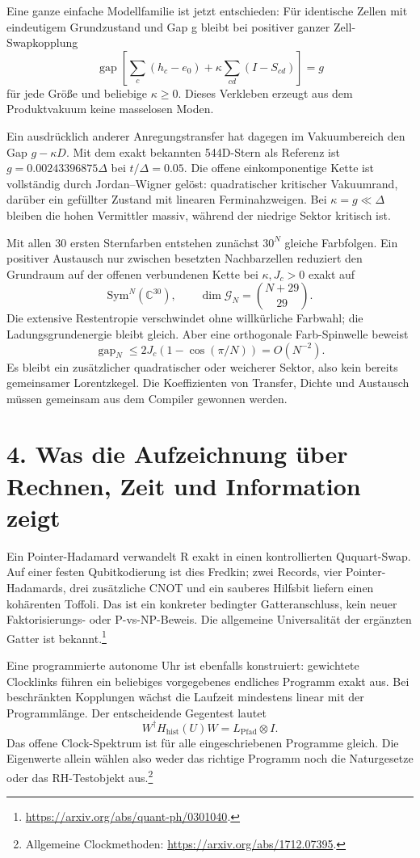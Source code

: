 Eine ganze einfache Modellfamilie ist jetzt entschieden: Für identische Zellen mit eindeutigem Grundzustand und Gap g bleibt bei positiver ganzer Zell-Swapkopplung
\[
\operatorname{gap}\left[\sum_c(h_c-e_0)+\kappa\sum_{cd}(I-S_{cd})\right]=g
\]
für jede Größe und beliebige $\kappa\ge0$. Dieses Verkleben erzeugt aus dem Produktvakuum keine masselosen Moden.

Ein ausdrücklich anderer Anregungstransfer hat dagegen im Vakuumbereich den Gap $g-\kappa D$. Mit dem exakt bekannten 544D-Stern als Referenz ist $g=0.00243396875\Delta$ bei $t/\Delta=0.05$. Die offene einkomponentige Kette ist vollständig durch Jordan--Wigner gelöst: quadratischer kritischer Vakuumrand, darüber ein gefüllter Zustand mit linearen Ferminahzweigen. Bei $\kappa=g\ll\Delta$ bleiben die hohen Vermittler massiv, während der niedrige Sektor kritisch ist.

Mit allen 30 ersten Sternfarben entstehen zunächst $30^N$ gleiche Farbfolgen. Ein positiver Austausch nur zwischen besetzten Nachbarzellen reduziert den Grundraum auf der offenen verbundenen Kette bei $\kappa,J_c>0$ exakt auf
\[
\mathrm{Sym}^N(\mathbb C^{30}),\qquad\dim\mathcal G_N={N+29\choose29}.
\]
Die extensive Restentropie verschwindet ohne willkürliche Farbwahl; die Ladungsgrundenergie bleibt gleich. Aber eine orthogonale Farb-Spinwelle beweist
\[
\operatorname{gap}_N\le2J_c(1-\cos(\pi/N))=O(N^{-2}).
\]
Es bleibt ein zusätzlicher quadratischer oder weicherer Sektor, also kein bereits gemeinsamer Lorentzkegel. Die Koeffizienten von Transfer, Dichte und Austausch müssen gemeinsam aus dem Compiler gewonnen werden.

\section*{4. Was die Aufzeichnung über Rechnen, Zeit und Information zeigt}
Ein Pointer-Hadamard verwandelt R exakt in einen kontrollierten Ququart-Swap. Auf einer festen Qubitkodierung ist dies Fredkin; zwei Records, vier Pointer-Hadamards, drei zusätzliche CNOT und ein sauberes Hilfsbit liefern einen kohärenten Toffoli. Das ist ein konkreter bedingter Gatteranschluss, kein neuer Faktorisierungs- oder P-vs-NP-Beweis. Die allgemeine Universalität der ergänzten Gatter ist bekannt.\footnote{\url{https://arxiv.org/abs/quant-ph/0301040}.}

Eine programmierte autonome Uhr ist ebenfalls konstruiert: gewichtete Clocklinks führen ein beliebiges vorgegebenes endliches Programm exakt aus. Bei beschränkten Kopplungen wächst die Laufzeit mindestens linear mit der Programmlänge. Der entscheidende Gegentest lautet
\[
W^\dagger H_\mathrm{hist}(U)W=L_\mathrm{Pfad}\otimes I.
\]
Das offene Clock-Spektrum ist für alle eingeschriebenen Programme gleich. Die Eigenwerte allein wählen also weder das richtige Programm noch die Naturgesetze oder das RH-Testobjekt aus.\footnote{Allgemeine Clockmethoden: \url{https://arxiv.org/abs/1712.07395}.}

